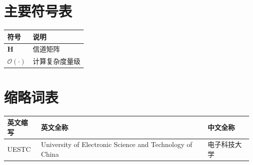 \chapter*{主要符号表}
\begin{tabular}{ll}
\toprule
符号 & 说明 \\
\midrule
$\mathbf{H}$ & 信道矩阵 \\
$\mathcal{O}(\cdot)$ & 计算复杂度量级 \\
\bottomrule
\end{tabular}

\chapter*{缩略词表}
\begin{tabular}{lll}
\toprule
英文缩写 & 英文全称 & 中文全称 \\
\midrule
UESTC & University of Electronic Science and Technology of China & 电子科技大学 \\
\bottomrule
\end{tabular}
